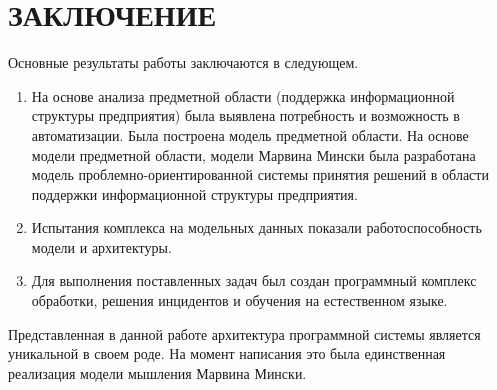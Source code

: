 \chapter*{ЗАКЛЮЧЕНИЕ}						%

Основные результаты работы заключаются в следующем.
\begin{enumerate}
  \item На основе анализа предметной области (поддержка информационной структуры предприятия) была выявлена потребность и возможность в автоматизации. Была построена модель предметной области. На основе модели предметной области, модели Марвина Мински была разработана модель проблемно-ориентированной системы принятия решений в области поддержки информационной структуры предприятия.  
  \item Испытания комплекса на модельных данных показали работоспособность модели и архитектуры.  
  \item Для выполнения поставленных задач был создан программный комплекс обработки, решения инцидентов и обучения на естественном языке. 
\end{enumerate}

Представленная в данной работе архитектура программной системы является уникальной в своем роде. На момент написания это была единственная реализация модели мышления Марвина Мински.

\clearpage